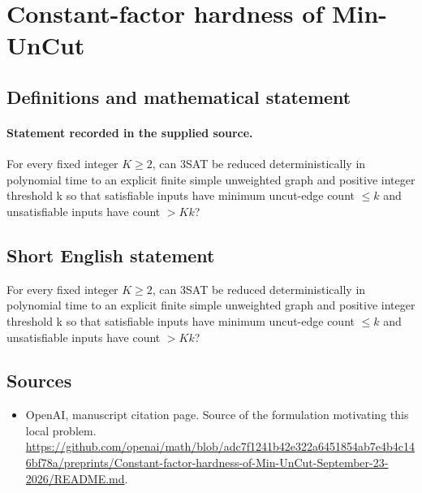 \documentclass[11pt]{article}
\begin{document}
\section*{Constant-factor hardness of Min-UnCut}\label{30007467}
\subsection{Definitions and mathematical statement}
\paragraph{Statement recorded in the supplied source.}
For every fixed integer $K\geq 2$, can 3SAT be reduced deterministically in polynomial time to an explicit finite simple unweighted graph and positive integer threshold k so that satisfiable inputs have minimum uncut-edge count $\leq k$ and unsatisfiable inputs have count $>Kk$?
\subsection{Short English statement}
For every fixed integer $K\geq 2$, can 3SAT be reduced deterministically in polynomial time to an explicit finite simple unweighted graph and positive integer threshold k so that satisfiable inputs have minimum uncut-edge count $\leq k$ and unsatisfiable inputs have count $>Kk$?
\subsection{Sources}
\begin{itemize}
\item[S1] OpenAI, manuscript citation page. Source of the formulation motivating this local problem.
\url{https://github.com/openai/math/blob/adc7f1241b42e322a6451854ab7e4b4c146bf78a/preprints/Constant-factor-hardness-of-Min-UnCut-September-23-2026/README.md}.
\end{itemize}
\end{document}
